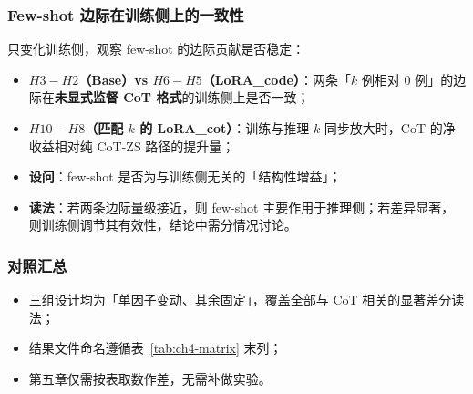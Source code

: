 \subsubsection{Few-shot 边际在训练侧上的一致性}
只变化训练侧，观察 few-shot 的边际贡献是否稳定：
\begin{itemize}
    \item \textbf{$H3 - H2$（Base）vs $H6 - H5$（LoRA\_code）}：两条「$k$ 例相对 $0$ 例」的边际在\textbf{未显式监督 CoT 格式}的训练侧上是否一致；
    \item \textbf{$H10 - H8$（匹配 $k$ 的 LoRA\_cot）}：训练与推理 $k$ 同步放大时，CoT 的净收益相对纯 CoT-ZS 路径的提升量；
    \item \textbf{设问}：few-shot 是否为与训练侧无关的「结构性增益」；
    \item \textbf{读法}：若两条边际量级接近，则 few-shot 主要作用于推理侧；若差异显著，则训练侧调节其有效性，结论中需分情况讨论。
\end{itemize}

\subsubsection{对照汇总}
\begin{itemize}
    \item 三组设计均为「单因子变动、其余固定」，覆盖全部与 CoT 相关的显著差分读法；
    \item 结果文件命名遵循表~\ref{tab:ch4-matrix} 末列；
    \item 第五章仅需按表取数作差，无需补做实验。
\end{itemize}